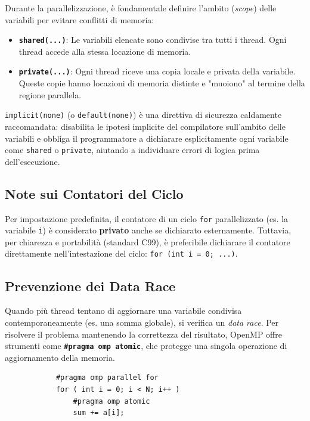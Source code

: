 \vspace{0.3cm}
\noindent
Durante la parallelizzazione, è fondamentale definire l'ambito (\textit{scope}) delle variabili per evitare conflitti di memoria:

\begin{itemize}
    \item \textbf{\texttt{shared(...)}}: Le variabili elencate sono condivise tra tutti i thread. Ogni thread accede alla stessa locazione di memoria.
    \item \textbf{\texttt{private(...)}}: Ogni thread riceve una copia locale e privata della variabile. Queste copie hanno locazioni di memoria distinte e "muoiono" al termine della regione parallela.
\end{itemize}

\vspace{0.3cm}
\noindent
\texttt{implicit(none)} (o \texttt{default(none)}) è una direttiva di sicurezza caldamente raccomandata: disabilita le ipotesi implicite del compilatore sull'ambito delle variabili e obbliga il programmatore a dichiarare esplicitamente ogni variabile come \texttt{shared} o \texttt{private}, aiutando a individuare errori di logica prima dell'esecuzione.

\subsection*{Note sui Contatori del Ciclo}
Per impostazione predefinita, il contatore di un ciclo \texttt{for} parallelizzato (es. la variabile \texttt{i}) è considerato \textbf{privato} anche se dichiarato esternamente. Tuttavia, per chiarezza e portabilità (standard C99), è preferibile dichiarare il contatore direttamente nell'intestazione del ciclo: \texttt{for (int i = 0; ...)}.

\subsection*{Prevenzione dei Data Race}
Quando più thread tentano di aggiornare una variabile condivisa contemporaneamente (es. una somma globale), si verifica un \textit{data race}. Per risolvere il problema mantenendo la correttezza del risultato, OpenMP offre strumenti come \textbf{\texttt{\#pragma omp atomic}}, che protegge una singola operazione di aggiornamento della memoria.

\begin{verbatim}
            #pragma omp parallel for
            for ( int i = 0; i < N; i++ )
                #pragma omp atomic
                sum += a[i];
\end{verbatim}


